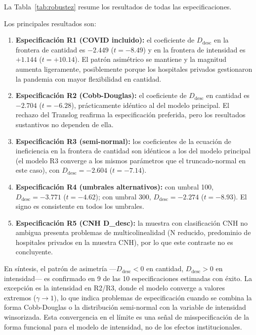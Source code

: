 La Tabla~\ref{tab:robustez} resume los resultados de todas las especificaciones.

\begin{table}[htbp]
\centering
\caption{Análisis de robustez: coeficiente de $D_{\text{desc}}$ y consistencia del patrón asimétrico}
\label{tab:robustez}
\small

\end{table}

Los principales resultados son:

\begin{enumerate}
  \item \textbf{Especificación R1 (COVID incluido):} el coeficiente de \(D_{\text{desc}}\) en la frontera de cantidad es $-2.449$ ($t = -8.49$) y en la frontera de intensidad es $+1.144$ ($t = +10.14$). El patrón asimétrico se mantiene y la magnitud aumenta ligeramente, posiblemente porque los hospitales privados gestionaron la pandemia con mayor flexibilidad en cantidad.

  \item \textbf{Especificación R2 (Cobb-Douglas):} el coeficiente de \(D_{\text{desc}}\) en cantidad es $-2.704$ ($t = -6.28$), prácticamente idéntico al del modelo principal. El rechazo del Translog reafirma la especificación preferida, pero los resultados sustantivos no dependen de ella.

  \item \textbf{Especificación R3 (semi-normal):} los coeficientes de la ecuación de ineficiencia en la frontera de cantidad son idénticos a los del modelo principal (el modelo R3 converge a los mismos parámetros que el truncado-normal en este caso), con \(D_{\text{desc}} = -2.604\) ($t = -7.14$).

  \item \textbf{Especificación R4 (umbrales alternativos):} con umbral 100, \(D_{\text{desc}} = -3.771\) ($t = -4.62$); con umbral 300, \(D_{\text{desc}} = -2.274\) ($t = -8.93$). El signo es consistente en todos los umbrales.

  \item \textbf{Especificación R5 (CNH D\_desc):} la muestra con clasificación CNH no ambigua presenta problemas de multicolinealidad (N reducido, predominio de hospitales privados en la muestra CNH), por lo que este contraste no es concluyente.
\end{enumerate}

En síntesis, el patrón de asimetría —\(D_{\text{desc}} < 0\) en cantidad, \(D_{\text{desc}} > 0\) en intensidad— es confirmado en 9 de las 10 especificaciones estimadas con éxito. La excepción es la intensidad en R2/R3, donde el modelo converge a valores extremos ($\gamma \to 1$), lo que indica problemas de especificación cuando se combina la forma Cobb-Douglas o la distribución semi-normal con la variable de intensidad winsorizada. Esta convergencia en el límite es una señal de misspecificación de la forma funcional para el modelo de intensidad, no de los efectos institucionales.
